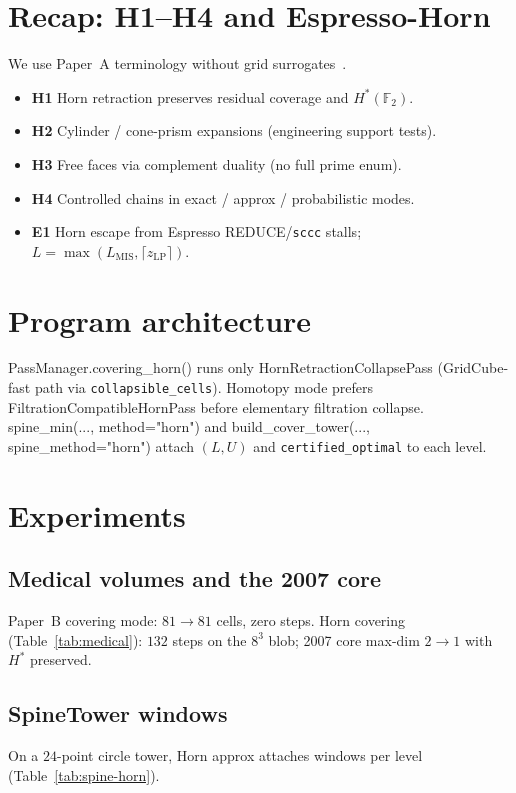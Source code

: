 \documentclass[11pt]{article}
\begin{document}
\section{Recap: H1--H4 and Espresso-Horn}
\label{sec:recap}

We use Paper~A terminology without grid surrogates~\cite{paperA}.
\begin{itemize}
\item \textbf{H1} Horn retraction preserves residual coverage and $H^*(\mathbb{F}_2)$.
\item \textbf{H2} Cylinder / cone-prism expansions (engineering support tests).
\item \textbf{H3} Free faces via complement duality (no full prime enum).
\item \textbf{H4} Controlled chains in exact / approx / probabilistic modes.
\item \textbf{E1} Horn escape from Espresso \textsf{REDUCE}/\texttt{sccc} stalls;
$L=\max(L_{\mathrm{MIS}},\lceil z_{\mathrm{LP}}\rceil)$.
\end{itemize}

\section{Program architecture}
\label{sec:arch}

\textsf{PassManager.covering\_horn()} runs only
\textsf{HornRetractionCollapsePass} (GridCube-fast path via
\texttt{collapsible\_cells}).  Homotopy mode prefers
\textsf{FiltrationCompatibleHornPass} before elementary filtration collapse.
\textsf{spine\_min(..., method="horn")} and \textsf{build\_cover\_tower(..., spine\_method="horn")}
attach $(L,U)$ and \texttt{certified\_optimal} to each level.

\section{Experiments}
\label{sec:experiments}

\subsection{Medical volumes and the 2007 core}
Paper~B covering mode: $81\to 81$ cells, zero steps.  Horn covering
(Table~\ref{tab:medical}): $132$ steps on the $8^3$ blob; 2007 core max-dim
$2\to 1$ with $H^*$ preserved.



\subsection{SpineTower windows}
On a $24$-point circle tower, Horn approx attaches windows per level
(Table~\ref{tab:spine-horn}).
\end{document}
